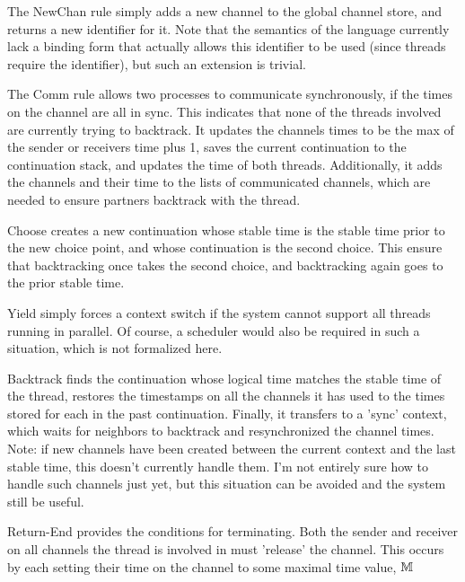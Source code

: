\documentclass[9pt]{article}
\begin{document}
  \SyntaxFigure

  \StatePredFigure


\clearpage 

  The NewChan rule simply adds a new channel to the global channel
  store, and returns a new identifier for it. Note that the semantics of
  the language currently lack a binding form that actually allows this
  identifier to be used (since threads require the identifier), but such
  an extension is trivial. 

  The Comm rule allows two processes to communicate synchronously, if
  the times on the channel are all in sync. This indicates that none of
  the threads involved are currently trying to backtrack. It updates the
  channels times to be the max of the sender or receivers time plus 1,
  saves the current continuation to the continuation stack, and updates
  the time of both threads. Additionally, it adds the channels and their
  time to the lists of communicated channels, which are needed to ensure
  partners backtrack with the thread.

  Choose creates a new continuation whose stable time is the stable time
  prior to the new choice point, and whose continuation is the second
  choice. This ensure that backtracking once takes the second choice,
  and backtracking again goes to the prior stable time.

  Yield simply forces a context switch if the system cannot support all
  threads running in parallel. Of course, a scheduler would also be
  required in such a situation, which is not formalized here.

  Backtrack finds the continuation whose logical time matches the stable
  time of the thread, restores the timestamps on all the
  channels it has used to the times stored for each in the past
  continuation.  Finally, it transfers to a 'sync' context, which waits
  for neighbors to backtrack and resynchronized the channel times.  
  Note: if new channels have been created between the current context
  and the last stable time, this doesn't currently handle them. I'm not
  entirely sure how to handle such channels just yet, but this situation
  can be avoided and the system still be useful.

  Return-End provides the conditions for terminating. Both the sender
  and receiver on all channels the thread is involved in must 'release'
  the channel. This occurs by each setting their time on the channel to
  some maximal time value, $\mathbb{M}$
\end{document}
